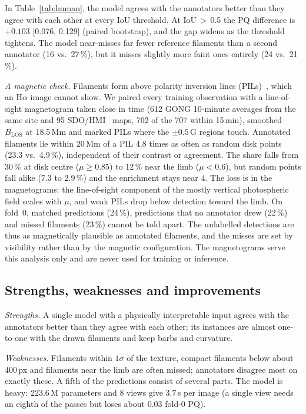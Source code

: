 \documentclass[sigconf]{acmart}
\begin{document}
In Table~\ref{tab:human}, the model agrees with the annotators better than they agree with each other at every IoU threshold. At IoU\,$>$\,0.5 the PQ difference is $+0.103$ [0.076, 0.129] (paired bootstrap), and the gap widens as the threshold tightens. The model near-misses far fewer reference filaments than a second annotator (16 vs.\ 27\,\%), but it misses slightly more faint ones entirely (24 vs.\ 21\,\%).

\emph{A magnetic check.} Filaments form above polarity inversion lines (PILs)~\cite{martin1998filaments,mackay2010prominences}, which an H$\alpha$ image cannot show. We paired every training observation with a line-of-sight magnetogram taken close in time (612 GONG 10-minute averages from the same site and 95 SDO/HMI~\cite{scherrer2012hmi} maps, 702 of the 707 within 15\,min), smoothed $B_{\mathrm{LOS}}$ at 18.5\,Mm and marked PILs where the $\pm0.5$\,G regions touch. Annotated filaments lie within 20\,Mm of a PIL 4.8 times as often as random disk points (23.3 vs.\ 4.9\,\%), independent of their contrast or agreement. The share falls from 30\,\% at disk centre ($\mu\ge0.85$) to 12\,\% near the limb ($\mu<0.6$), but random points fall alike (7.3 to 2.9\,\%) and the enrichment stays near 4. The loss is in the magnetograms: the line-of-sight component of the mostly vertical photospheric field scales with $\mu$, and weak PILs drop below detection toward the limb. On fold~0, matched predictions (24\,\%), predictions that no annotator drew (22\,\%) and missed filaments (23\,\%) cannot be told apart. The unlabelled detections are thus as magnetically plausible as annotated filaments, and the misses are set by visibility rather than by the magnetic configuration. The magnetograms serve this analysis only and are never used for training or inference.

\subsection{Strengths, weaknesses and improvements}
\emph{Strengths.} A single model with a physically interpretable input agrees with the annotators better than they agree with each other; its instances are almost one-to-one with the drawn filaments and keep barbs and curvature.

\emph{Weaknesses.} Filaments within $1\sigma$ of the texture, compact filaments below about 400\,px and filaments near the limb are often missed; annotators disagree most on exactly these. A fifth of the predictions consist of several parts. The model is heavy: 223.6\,M parameters and 8 views give 3.7\,s per image (a single view needs an eighth of the passes but loses about 0.03 fold-0 PQ).
\end{document}
